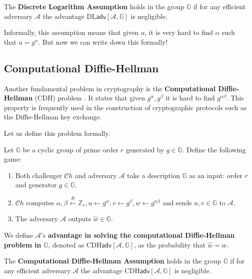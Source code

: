 \documentclass[../lecture-notes-148x210.tex]{subfiles}
\begin{document}
\begin{definition}
    The \textbf{Discrete Logarithm Assumption} holds in the group $\mathbb{G}$ 
    if for any efficient adversary $\mathcal{A}$ the advantage $\text{DL}\mathsf{adv}[\mathcal{A},\mathbb{G}]$ 
    is negligible.
\end{definition}

Informally, this assumption means that given $u$, it is very hard to find $\alpha$ such that $u = g^{\alpha}$. 
But now we can write down this formally!

\subsection{Computational Diffie-Hellman}

Another fundamental problem in cryptography is the \textbf{Computational Diffie-Hellman} (CDH) problem \cite[chapter 16]{Dan_Boneh_2023}. 
It states that given $g^{\alpha},g^{\beta}$ it is hard to find $g^{\alpha\beta}$. This property is frequently used 
in the construction of cryptographic protocols such as the Diffie-Hellman key exchange.

Let us define this problem formally.

\begin{definition}
    Let $\mathbb{G}$ be a cyclic group of prime order $r$ generated by $g \in \mathbb{G}$. Define the following game:
    \begin{enumerate}
        \item Both challenger $\mathcal{C}h$ and adversary $\mathcal{A}$ take a description $\mathbb{G}$ as an input: order $r$ and generator $g \in \mathbb{G}$.
        \item $\mathcal{C}h$ computes $\alpha, \beta \xleftarrow{R} \mathbb{Z}_r, u \gets g^{\alpha}, v \gets g^{\beta}, w \gets g^{\alpha\beta}$ and sends $u,v \in \mathbb{G}$ to $\mathcal{A}$.
        \item The adversary $\mathcal{A}$ outputs $\hat{w} \in \mathbb{G}$.
    \end{enumerate}

    We define $\mathcal{A}$'s \textbf{advantage in solving the computational Diffie-Hellman problem in $\mathbb{G}$}, 
    denoted as $\text{CDH}\mathsf{adv}[\mathcal{A},\mathbb{G}]$, as the probability that $\hat{w} = w$.
\end{definition}

\begin{definition}
    The \textbf{Computational Diffie-Hellman Assumption} holds in the group $\mathbb{G}$ if for any efficient 
    adversary $\mathcal{A}$ the advantage $\text{CDH}\mathsf{adv}[\mathcal{A},\mathbb{G}]$ is negligible.
\end{definition}
\end{document}
